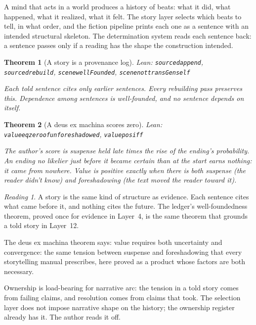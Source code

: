 \documentclass[11pt]{article}
\newcommand{\leanus}{\textunderscore\allowbreak}
\newcommand{\lean}[1]{{\let\_\leanus\texttt{#1}}}
\newtheorem{theorem}{Theorem}[section]
\theoremstyle{remark}
\newtheorem*{reading}{Reading}
\begin{document}
A mind that acts in a world produces a history of beats: what it did, what happened, what
it realized, what it felt. The story layer selects which beats to tell, in what order, and
the fiction pipeline prints each one as a sentence with an intended structural skeleton.
The determination system reads each sentence back: a sentence passes only if a reading
has the shape the construction intended.

\begin{theorem}[A story is a provenance log]
{\small\sloppy Lean: \lean{sourced\_append}, \lean{sourced\_rebuild},
\lean{scene\_wellFounded}, \lean{scene\_not\_transGen\_self}\par}
Each told sentence cites only earlier sentences. Every rebuilding pass preserves this.
Dependence among sentences is well-founded, and no sentence depends on itself.
\end{theorem}

\begin{theorem}[A deus ex machina scores zero]
{\small\sloppy Lean: \lean{value\_eq\_zero\_of\_unforeshadowed},
\lean{value\_pos\_iff}\par}
The author's score is suspense held late times the rise of the ending's probability. An
ending no likelier just before it became certain than at the start earns nothing: it came
from nowhere. Value is positive exactly when there is both suspense (the reader didn't
know) and foreshadowing (the text moved the reader toward it).
\end{theorem}

\begin{reading}
A story is the same kind of structure as evidence. Each sentence cites what came before
it, and nothing cites the future. The ledger's well-foundedness theorem, proved once for
evidence in Layer~4, is the same theorem that grounds a told story in Layer~12.

The deus ex machina theorem says: value requires both uncertainty and convergence: the
same tension between suspense and foreshadowing that every storytelling manual prescribes,
here proved as a product whose factors are both necessary.

Ownership is load-bearing for narrative arc: the tension in a told story comes from
failing claims, and resolution comes from claims that took. The selection layer does not
impose narrative shape on the history; the ownership register already has it. The author
reads it off.
\end{reading}
\end{document}
